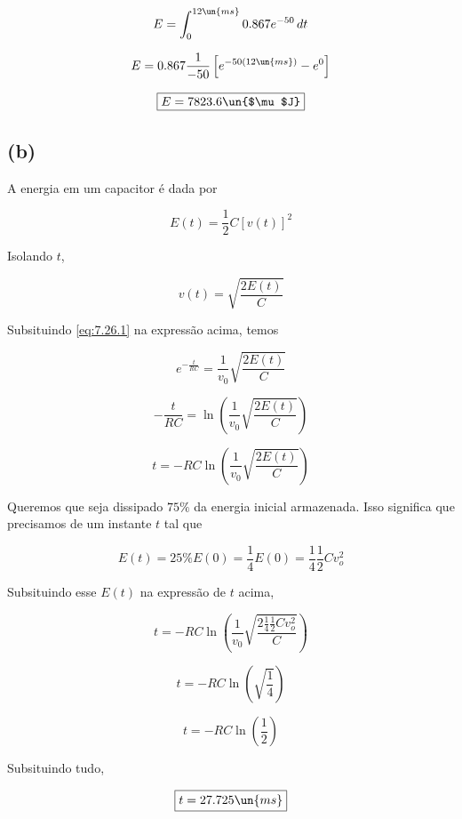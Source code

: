 \[ E = \int_{0}^{12 \un{ms}} 0.867e^{-50} \,dt \]

\[ E = 0.867 \frac{1}{-50} \left[e^{-50(12 \un{ms})} - e^{0}\right] \]

\[ \boxed{E = 7823.6 \un{$\mu$J}}  \]

\subsection*{(b)}

A energia em um capacitor é dada por  

\begin{equation}\label{eq:7.26.2}
    E(t) = \frac{1}{2}C[v(t)]^2
\end{equation}

Isolando $t$, 

\[ v(t) = \sqrt{\frac{2E(t)}{C}}  \]

Subsituindo \eqref{eq:7.26.1} na expressão acima, temos   

\[ e^{-\frac{t}{RC}} = \frac{1}{v_0} \sqrt{\frac{2E(t)}{C}}  \]

\[ -\frac{t}{RC} = \ln \left(\frac{1}{v_0} \sqrt{\frac{2E(t)}{C}}\right)   \]

\[ t = -RC\ln \left(\frac{1}{v_0} \sqrt{\frac{2E(t)}{C}}\right)   \]

Queremos que seja dissipado $75\%$ da energia inicial armazenada. Isso significa que precisamos de um instante $t$ tal que

\[ E(t) = 25\% E(0) = \frac{1}{4}E(0) = \frac{1}{4}\frac{1}{2}Cv_o^2 \]

Subsituindo esse $E(t)$ na expressão de $t$ acima,   

\[ t = -RC\ln \left(\frac{1}{v_0} \sqrt{\frac{2\frac{1}{4}\frac{1}{2}Cv_o^2}{C}}\right)  \]

\[ t = -RC\ln \left(\sqrt{\frac{1}{4}}\right)  \]

\[ t = -RC\ln \left(\frac{1}{2}\right)  \]

Subsituindo tudo,   

\[ \boxed{t = 27.725 \un{ms}}  \]

















